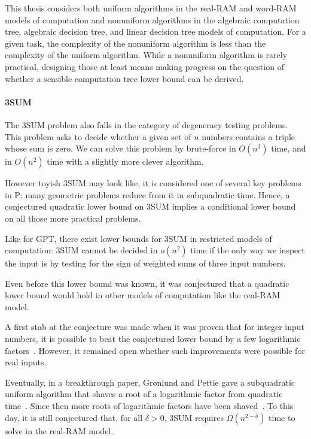 This thesis considers both uniform algorithms in the real-RAM and word-RAM
models of computation and nonuniform algorithms in the algebraic computation
tree, algebraic decision tree, and linear decision tree models of computation.
For a given task, the complexity of the nonuniform algorithm is less than
the complexity of the uniform algorithm. While a nonuniform algorithm is rarely
practical, designing those at least means making progress on the question of
whether a sensible computation tree lower bound can be derived.

\paragraph{3SUM}
The 3SUM problem also falls in the category of degeneracy testing problems.
This problem asks to decide whether a given set of \(n\) numbers contains a triple
whose sum is zero. We can solve this problem by brute-force in \(O(n^3)\) time,
and in \(O(n^2)\) time with a slightly more clever algorithm.

However toyish 3SUM may look like, it is considered one of several key problems
in P: many geometric problems reduce from it in subquadratic time. Hence, a
conjectured quadratic lower bound on 3SUM implies a conditional lower bound on
all those more practical problems.

Like for GPT, there exist lower bounds for 3SUM in restricted models of
computation: 3SUM cannot be decided in \(o(n^2)\) time if the only way we
inspect the input is by testing for the sign of weighted sums of three
input numbers.

Even before this lower bound was known, it was conjectured that a quadratic lower
bound would hold in other models of computation like the real-RAM model.

A first stab at the conjecture was made when it was proven that for integer
input numbers, it is possible to beat the conjectured lower bound by a few
logarithmic factors~\cite{BDP08}.
However, it remained open whether such improvements were
possible for real inputs.

Eventually, in a breakthrough paper, Gr\o nlund and Pettie gave a subquadratic
uniform algorithm that shaves a root of a logarithmic factor from quadratic
time~\cite{GP18}.
%
Since then more roots of logarithmic factors have been shaved~\cite{Fr15,GS15}.
%
To this day, it is still conjectured that, for all \(\delta > 0\), 3SUM
requires \(\Omega(n^{2 - \delta})\) time to solve in the real-RAM model.

